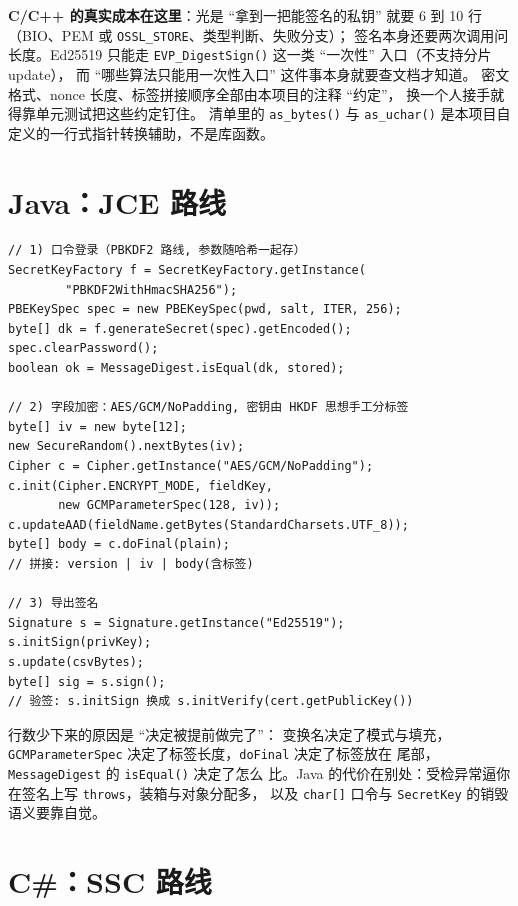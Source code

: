 \documentclass[12pt,a4paper,fontset=fandol]{ctexbook}
\newcommand{\Fn}[1]{\texttt{#1()}}
\newcommand{\Tp}[1]{\texttt{#1}}
\newcommand{\CSharp}{C\#}
\newcommand{\CppJava}{C/C++}
\begin{document}
\textbf{\CppJava{} 的真实成本在这里}：光是 ``拿到一把能签名的私钥''
就要 6 到 10 行（BIO、PEM 或 \Tp{OSSL\_STORE}、类型判断、失败分支）；
签名本身还要两次调用问长度。Ed25519 只能走 \Fn{EVP\_DigestSign}
这一类 ``一次性'' 入口（不支持分片 update），
而 ``哪些算法只能用一次性入口'' 这件事本身就要查文档才知道。
密文格式、nonce 长度、标签拼接顺序全部由本项目的注释 ``约定''，
换一个人接手就得靠单元测试把这些约定钉住。
清单里的 \Fn{as\_bytes} 与 \Fn{as\_uchar}
是本项目自定义的一行式指针转换辅助，不是库函数。

\section{Java：JCE 路线}

\begin{lstlisting}[style=javastyle,caption={Java：三段需求对应三类对象}]
// 1) 口令登录（PBKDF2 路线, 参数随哈希一起存）
SecretKeyFactory f = SecretKeyFactory.getInstance(
        "PBKDF2WithHmacSHA256");
PBEKeySpec spec = new PBEKeySpec(pwd, salt, ITER, 256);
byte[] dk = f.generateSecret(spec).getEncoded();
spec.clearPassword();
boolean ok = MessageDigest.isEqual(dk, stored);

// 2) 字段加密：AES/GCM/NoPadding, 密钥由 HKDF 思想手工分标签
byte[] iv = new byte[12];
new SecureRandom().nextBytes(iv);
Cipher c = Cipher.getInstance("AES/GCM/NoPadding");
c.init(Cipher.ENCRYPT_MODE, fieldKey,
       new GCMParameterSpec(128, iv));
c.updateAAD(fieldName.getBytes(StandardCharsets.UTF_8));
byte[] body = c.doFinal(plain);
// 拼接: version | iv | body(含标签)

// 3) 导出签名
Signature s = Signature.getInstance("Ed25519");
s.initSign(privKey);
s.update(csvBytes);
byte[] sig = s.sign();
// 验签: s.initSign 换成 s.initVerify(cert.getPublicKey())
\end{lstlisting}

行数少下来的原因是 ``决定被提前做完了''：
变换名决定了模式与填充，\Tp{GCMParameter\allowbreak{}Spec}
决定了标签长度，\Tp{doFinal} 决定了标签放在
尾部，\Tp{Message\allowbreak{}Digest} 的 \Fn{isEqual} 决定了怎么
比。Java 的代价在别处：受检异常逼你在签名上写
\texttt{throws}，装箱与对象分配多，
以及 \Tp{char[]} 口令与 \Tp{SecretKey} 的销毁语义要靠自觉。

\section{\CSharp{}：SSC 路线}
\end{document}

